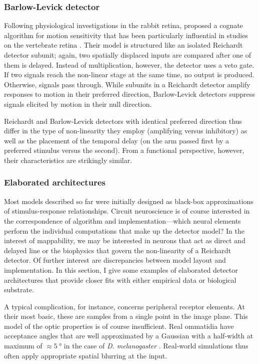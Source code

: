 \subsubsection{Barlow-Levick detector}
Following physiological investigations in the rabbit retina, \citet{Barlow:1965aa} proposed a cognate algorithm for motion sensitivity that has been particularly influential in studies on the vertebrate retina \citep{Borst:2015ko}. Their model is structured like an isolated Reichardt detector subunit; again, two spatially displaced inputs are compared after one of them is delayed. Instead of multiplication, however, the detector uses a veto gate. If two signals reach the non-linear stage at the same time, no output is produced. Otherwise, signals pass through. While subunits in a Reichardt detector amplify responses to motion in their preferred direction, Barlow-Levick detectors suppress signals elicited by motion in their null direction. 

Reichardt and Barlow-Levick detectors with identical preferred direction thus differ in the type of non-linearity they employ (amplifying versus inhibitory) as well as the placement of the temporal delay (on the arm passed first by a preferred stimulus versus the second). From a functional perspective, however, their characteristics are strikingly similar.

\subsubsection{Elaborated architectures}
Most models described so far were initially designed as black-box approximations of stimulus-response relationships. Circuit neuroscience is of course interested in the correspondence of algorithm and implementation---which neural elements perform the individual computations that make up the detector model? In the interest of mappability, we may be interested in neurons that act as direct and delayed line or the biophysics that govern the non-linearity of a Reichardt detector. Of further interest are discrepancies between model layout and implementation. In this section, I give some examples of elaborated detector architectures that provide closer fits with either empirical data or biological substrate.

A typical complication, for instance, concerns peripheral receptor elements. At their most basic, these are samples from a single point in the image plane. This model of the optic properties is of course insufficient. Real ommatidia have acceptance angles that are well approximated by a Gaussian with a half-width at maximum of $\approx \SI{5}{\degree}$ in the case of \textit{D. melanogaster} \citep{Goetz:1965aa}. Real-world simulations thus often apply appropriate spatial blurring at the input.

